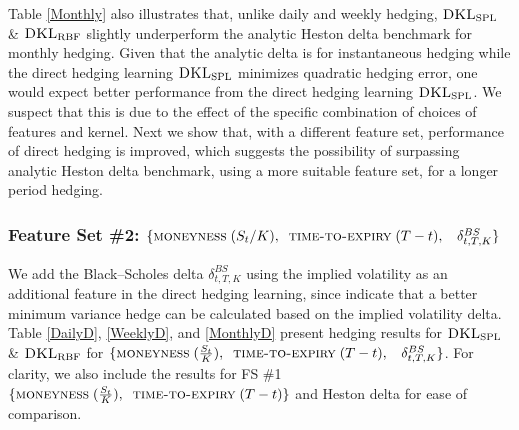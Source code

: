 \documentclass[letterpaper,12pt,titlepage,oneside,final]{book}
\numberwithin{equation}{section}
\theoremstyle{definition}
\newcommand{\DKLs}{\bf\textsc{DKL}_{\text{SPL}}}
\newcommand{\DKLg}{\bf\textsc{DKL}_{\text{RBF}}}
\begin{document}
Table \ref{Monthly} also illustrates that, unlike daily and weekly hedging, $\DKLs$ \& $\DKLg$ slightly underperform the analytic Heston delta benchmark  for monthly hedging.
Given that the analytic delta is for instantaneous hedging while the direct hedging learning $\DKLs$ minimizes quadratic hedging error, one would expect better performance from the direct hedging learning $\DKLs$. We suspect that this is due to the effect of the specific combination of choices of features and kernel. Next we show that,  with a different feature set,   performance of direct hedging is improved, which suggests the possibility of surpassing  analytic Heston delta benchmark, using a more suitable feature set, for a longer period hedging.


\subsubsection{Feature Set \#2: $ \{\textsc{moneyness} \;(S_t/K),\;\;\textsc{time-to-expiry} \;(T-t) ,\;\;~ \delta^{BS}_{t,T,K}\}$}
We add the Black–Scholes delta $\delta^{BS}_{t,T,K}$ using the implied volatility as an additional feature in the direct hedging learning, since \citet{hulloptimal} indicate that a better minimum  variance hedge can be calculated based on the implied volatility delta.  Table \ref{DailyD}, \ref{WeeklyD}, and \ref{MonthlyD}
present hedging results for  $\DKLs$ \& $\DKLg$ for  $\{\textsc{moneyness} \;(\frac{S_t}{K}),\;\;\textsc{time-to-expiry} \;(T-t) ,\;\;~ \delta^{BS}_{t,T,K}\}$. For clarity, we also include the results for FS \#1 $\{\textsc{moneyness} \;(\frac{S_t}{K}),\;\;\textsc{time-to-expiry} \;(T-t) \}$ and Heston delta for ease of comparison.
\end{document}
